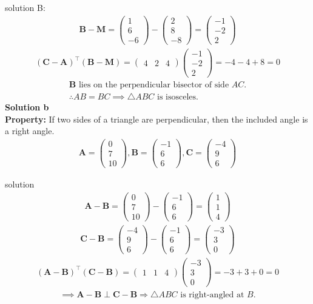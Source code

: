 \documentclass{beamer}
\numberwithin{equation}{section}
\theoremstyle{remark}
\newcommand{\myvec}[1]{\ensuremath{\begin{pmatrix}#1\end{pmatrix}}}
\let\vec\mathbf
\begin{document}
\begin{frame}{solution}
 B:
\begin{align}
\vec{B}-\vec{M} = \myvec{1\\6\\-6}-\myvec{2\\8\\-8} 
= \myvec{-1\\-2\\2}
\end{align}
\begin{align}
(\vec{C}-\vec{A})^\top(\vec{B}-\vec{M}) 
= \myvec{4&2&4}\myvec{-1\\-2\\2} = -4-4+8=0
\end{align}
\begin{align*}
 \vec{B} \text{ lies on the perpendicular bisector of side } AC.\\
 \therefore AB = BC \implies \triangle ABC \text{ is isosceles.}
\end{align*}
\textbf{Solution b}\\
\textbf{Property:} If two sides of a triangle are perpendicular, then the included angle is a right angle.
\begin{align}
\vec{A} = \myvec{0\\7\\10},  
\vec{B} = \myvec{-1\\6\\6},  
\vec{C} = \myvec{-4\\9\\6}
\end{align}
\end{frame}
\begin{frame}{solution}
\begin{align}
\vec{A}-\vec{B} = \myvec{0\\7\\10}-\myvec{-1\\6\\6} 
= \myvec{1\\1\\4}
\end{align}
\begin{align}
\vec{C}-\vec{B} = \myvec{-4\\9\\6}-\myvec{-1\\6\\6} 
= \myvec{-3\\3\\0}
\end{align}
\begin{align}
(\vec{A}-\vec{B})^\top(\vec{C}-\vec{B}) 
= \myvec{1&1&4}\myvec{-3\\3\\0} = -3+3+0=0
\end{align}
\begin{align*}
\implies \vec{A}-\vec{B} \perp \vec{C}-\vec{B}  \Rightarrow  
\triangle ABC \text{ is right-angled at } B.
\end{align*}



\end{frame}
\end{document}
